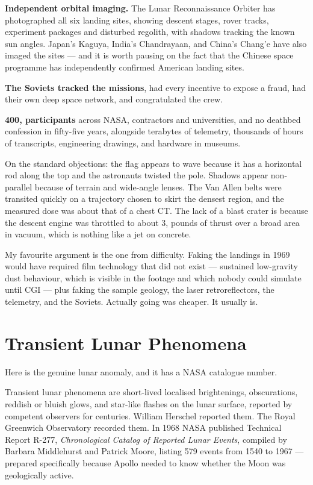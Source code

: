 \textbf{Independent orbital imaging.} The Lunar Reconnaissance Orbiter has photographed all six
landing sites, showing descent stages, rover tracks, experiment packages and disturbed regolith,
with shadows tracking the known sun angles. Japan's Kaguya, India's Chandrayaan, and China's
Chang'e have also imaged the sites --- and it is worth pausing on the fact that the Chinese space
programme has independently confirmed American landing sites.

\textbf{The Soviets tracked the missions}, had every incentive to expose a fraud, had their own deep
space network, and congratulated the crew.

\textbf{400, participants} across NASA, contractors and universities, and no deathbed
confession in fifty-five years, alongside terabytes of telemetry, thousands of hours of
transcripts, engineering drawings, and hardware in museums.

On the standard objections: the flag appears to wave because it has a horizontal rod along the top
and the astronauts twisted the pole. Shadows appear non-parallel because of terrain and wide-angle
lenses.  The Van Allen belts
were transited quickly on a trajectory chosen to skirt the densest region, and the measured dose was
about that of a chest CT. The lack of a blast crater is because the descent engine was throttled to
about 3, pounds of thrust over a broad area in vacuum, which is nothing like a jet on concrete.

\begin{funfact}
My favourite argument is the one from difficulty. Faking the landings in 1969 would have required
film technology that did not exist --- sustained low-gravity dust behaviour, which is visible in
the footage and which nobody could simulate until CGI --- plus faking the sample geology, the laser
retroreflectors, the telemetry, and the Soviets. Actually going was cheaper. It usually is.
\end{funfact}

\section{Transient Lunar Phenomena}\label{sec:transientlunarphenomena}

Here is the genuine lunar anomaly, and it has a NASA catalogue number.

Transient lunar phenomena are short-lived localised brightenings, obscurations, reddish or bluish
glows, and star-like flashes on the lunar surface, reported by competent observers for centuries.
William Herschel reported them. The Royal Greenwich Observatory recorded them. In 1968 NASA
published Technical Report R-277, \emph{Chronological Catalog of Reported Lunar Events}, compiled
by Barbara Middlehurst and Patrick Moore, listing 579 events from 1540 to 1967 --- prepared
specifically because Apollo needed to know whether the Moon was geologically active.

